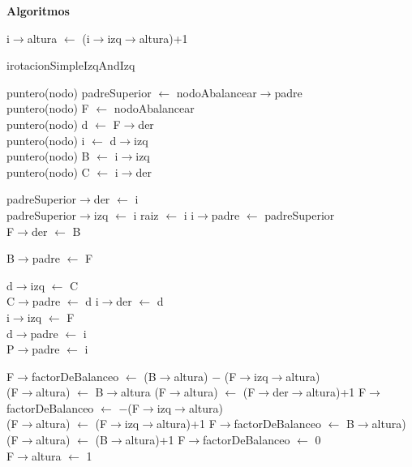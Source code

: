 \documentclass[a4paper,10pt]{article}
\newenvironment{Algoritmos}{%
  \vspace*{2ex}%
  \noindent\textbf{\Large Algoritmos}%
  \vspace*{2ex}%
}{}
\begin{document}
\begin{Algoritmos}
\begin{algorithm}[H]
{{{i$\rightarrow$altura $\leftarrow$ (i$\rightarrow$izq$\rightarrow$altura)+1}
}
}
\caption{irotacionSimpleIzqAndIzq}
\end{algorithm}
\newpage
{}
\newline
\begin{algorithm}[H]
{puntero(nodo) padreSuperior $\leftarrow$ nodoAbalancear$\rightarrow$padre\\}
{puntero(nodo) F $\leftarrow$ nodoAbalancear\\}
{puntero(nodo) d $\leftarrow$ F$\rightarrow$der\\}
{puntero(nodo) i $\leftarrow$ d$\rightarrow$izq\\}
{puntero(nodo) B $\leftarrow$ i$\rightarrow$izq\\}
{puntero(nodo) C $\leftarrow$ i$\rightarrow$der\\}

{
{
{padreSuperior$\rightarrow$der $\leftarrow$ i \\
}
{padreSuperior$\rightarrow$izq $\leftarrow$ i}
}
{raiz $\leftarrow$ i}
}
{i$\rightarrow$padre $\leftarrow$ padreSuperior\\}
{F$\rightarrow$der $\leftarrow$ B\\}

{
{B$\rightarrow$padre $\leftarrow$ F}
{}
}


{d$\rightarrow$izq $\leftarrow$ C\\}
{
{C$\rightarrow$padre $\leftarrow$ d}
{}
}
{i$\rightarrow$der $\leftarrow$ d\\}
{i$\rightarrow$izq $\leftarrow$ F\\}
{d$\rightarrow$padre $\leftarrow$ i\\}
{P$\rightarrow$padre $\leftarrow$ i\\}

{
{
{F$\rightarrow$factorDeBalanceo $\leftarrow$ (B$\rightarrow$altura) $-$ (F$\rightarrow$izq$\rightarrow$altura)\\
{
{(F$\rightarrow$altura) $\leftarrow$ B$\rightarrow$altura}
{(F$\rightarrow$altura) $\leftarrow$ (F$\rightarrow$der$\rightarrow$altura)+1}
}
}
{F$\rightarrow$factorDeBalanceo $\leftarrow$ $-$(F$\rightarrow$izq$\rightarrow$altura) \\
(F$\rightarrow$altura) $\leftarrow$ (F$\rightarrow$izq$\rightarrow$altura)+1
}
}
{
{F$\rightarrow$factorDeBalanceo $\leftarrow$ B$\rightarrow$altura)\\
(F$\rightarrow$altura) $\leftarrow$ (B$\rightarrow$altura)+1}
{F$\rightarrow$factorDeBalanceo $\leftarrow$ 0\\
 F$\rightarrow$altura $\leftarrow$ 1}
}
}
\end{algorithm}


\end{Algoritmos}
\end{document}
